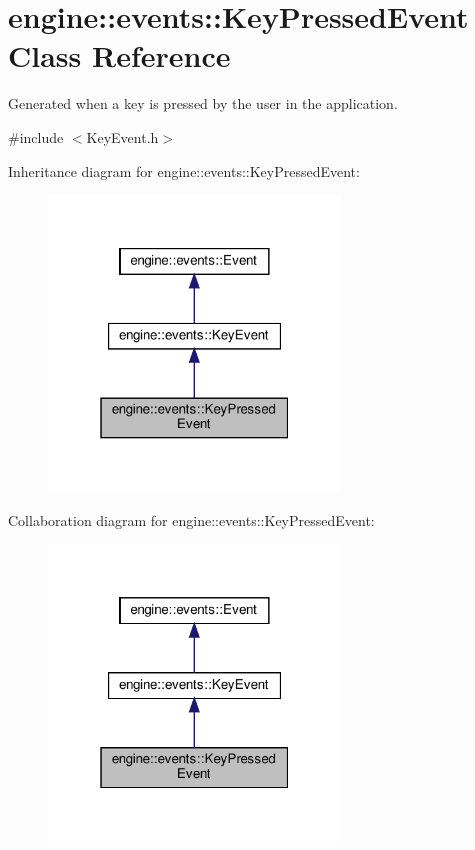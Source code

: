 \hypertarget{classengine_1_1events_1_1KeyPressedEvent}{}\section{engine\+:\+:events\+:\+:Key\+Pressed\+Event Class Reference}
\label{classengine_1_1events_1_1KeyPressedEvent}


Generated when a key is pressed by the user in the application.  




{\ttfamily \#include $<$Key\+Event.\+h$>$}



Inheritance diagram for engine\+:\+:events\+:\+:Key\+Pressed\+Event\+:
\nopagebreak
\begin{figure}[H]
\begin{center}
\leavevmode
\includegraphics[width=220pt]{classengine_1_1events_1_1KeyPressedEvent__inherit__graph}
\end{center}
\end{figure}


Collaboration diagram for engine\+:\+:events\+:\+:Key\+Pressed\+Event\+:
\nopagebreak
\begin{figure}[H]
\begin{center}
\leavevmode
\includegraphics[width=220pt]{classengine_1_1events_1_1KeyPressedEvent__coll__graph}
\end{center}
\end{figure}

